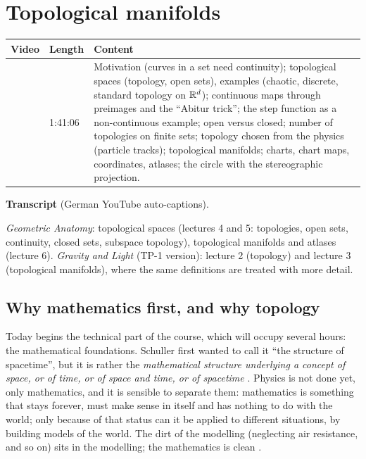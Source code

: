 \chapter{Topological manifolds}\label{ch:c02}
\begin{paracol}{2}

\begin{sources}
\begin{tabularx}{\linewidth}{@{}l l L@{}}
\toprule
\textbf{Video} & \textbf{Length} & \textbf{Content}\\
\midrule
{} & 1:41:06 & Motivation (curves in a set need
continuity); topological spaces (topology, open sets), examples (chaotic, discrete, standard topology on $\mathbb{R}^d$);
continuous maps through preimages and the ``Abitur trick''; the step function as a non-continuous example; open versus
closed; number of topologies on finite sets; topology chosen from the physics (particle tracks); topological manifolds;
charts, chart maps, coordinates, atlases; the circle with the stereographic projection.\\
\bottomrule
\end{tabularx}

\smallskip
\textbf{Transcript}  (German YouTube auto-captions).
\end{sources}

\begin{reading}
\emph{Geometric Anatomy}: topological spaces (lectures 4 and 5: topologies, open sets, continuity, closed sets,
subspace topology), topological manifolds and atlases (lecture 6).
\emph{Gravity and Light} (TP-1 version): lecture 2 (topology) and lecture 3 (topological manifolds), where the
same definitions are treated with more detail.
\end{reading}

\section{Why mathematics first, and why topology}\label{sec:tm-motivation}

Today begins the technical part of the course, which will occupy several hours: the mathematical foundations.
Schuller first wanted to call it ``the structure of spacetime'', but it is rather the \emph{mathematical structure
underlying a concept of space, or of time, or of space and time, or of spacetime} .
Physics is not done yet, only mathematics, and it is sensible to separate them: mathematics is something that stays
forever, must make sense in itself and has nothing to do with the world; only because of that status can it be applied
to different situations, by building models of the world. The dirt of the modelling (neglecting air resistance, and so
on) sits in the modelling; the mathematics is clean .


\end{paracol}
